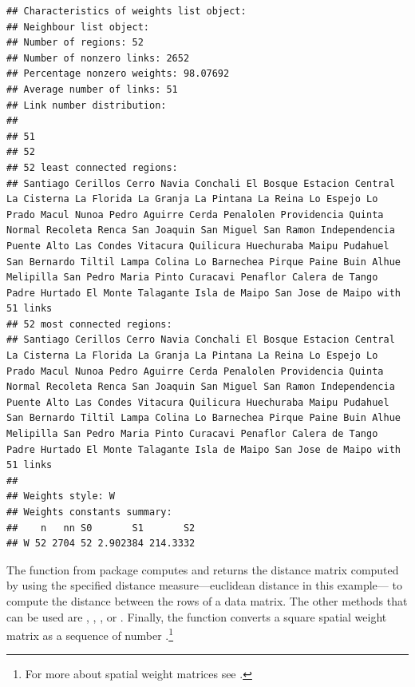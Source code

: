 \begin{knitrout}
\begin{kframe}
\begin{alltt}
 \hlkwb{<-}   \hlstd{=} \hlstd{,}  \hlopt{$}
\end{alltt}
\begin{verbatim}
## Characteristics of weights list object:
## Neighbour list object:
## Number of regions: 52 
## Number of nonzero links: 2652 
## Percentage nonzero weights: 98.07692 
## Average number of links: 51 
## Link number distribution:
## 
## 51 
## 52 
## 52 least connected regions:
## Santiago Cerillos Cerro Navia Conchali El Bosque Estacion Central La Cisterna La Florida La Granja La Pintana La Reina Lo Espejo Lo Prado Macul Nunoa Pedro Aguirre Cerda Penalolen Providencia Quinta Normal Recoleta Renca San Joaquin San Miguel San Ramon Independencia Puente Alto Las Condes Vitacura Quilicura Huechuraba Maipu Pudahuel San Bernardo Tiltil Lampa Colina Lo Barnechea Pirque Paine Buin Alhue Melipilla San Pedro Maria Pinto Curacavi Penaflor Calera de Tango Padre Hurtado El Monte Talagante Isla de Maipo San Jose de Maipo with 51 links
## 52 most connected regions:
## Santiago Cerillos Cerro Navia Conchali El Bosque Estacion Central La Cisterna La Florida La Granja La Pintana La Reina Lo Espejo Lo Prado Macul Nunoa Pedro Aguirre Cerda Penalolen Providencia Quinta Normal Recoleta Renca San Joaquin San Miguel San Ramon Independencia Puente Alto Las Condes Vitacura Quilicura Huechuraba Maipu Pudahuel San Bernardo Tiltil Lampa Colina Lo Barnechea Pirque Paine Buin Alhue Melipilla San Pedro Maria Pinto Curacavi Penaflor Calera de Tango Padre Hurtado El Monte Talagante Isla de Maipo San Jose de Maipo with 51 links
## 
## Weights style: W 
## Weights constants summary:
##    n   nn S0       S1       S2
## W 52 2704 52 2.902384 214.3332
\end{verbatim}
\end{kframe}
\end{knitrout}

The function  from  package computes and returns the distance matrix computed by using the specified distance measure---euclidean distance in this example--- to compute the distance between the rows of a data matrix. The other methods that can be used are , , ,  or . Finally, the  function converts a square spatial weight matrix as a sequence of number .\footnote{For more about spatial weight matrices see \citep{stewart2010choosing}.}

